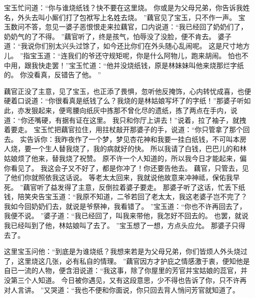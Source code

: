 宝玉忙问道：“你与谁烧纸钱？快不要在这里烧。
你或是为父母兄弟，你告诉我姓名，外头去叫小厮们打了包袱写上名姓去烧。
”藕官见了宝玉，只不作一声。
宝玉数问不答，忽见一婆子恶恨恨走来拉藕官，口内说道：“我已经回了奶奶们了，奶奶气的了不得。
”藕官听了，终是孩气，怕辱没了没脸，便不肯去。
婆子道：“我说你们别太兴头过馀了，如今还比你们在外头随心乱闹呢。
这是尺寸地方儿。
”指宝玉道：“连我们的爷还守规矩呢，你是什么阿物儿，跑来胡闹。
怕也不中用，跟我快走罢！”宝玉忙道：“他并没烧纸钱，原是林妹妹叫他来烧那烂字纸的。
你没看真，反错告了他。
”\par
藕官正没了主意，见了宝玉，也正添了畏惧，忽听他反掩饰，心内转忧成喜，也便硬着口说道：“你很看真是纸钱了么？我烧的是林姑娘写坏了的字纸！”那婆子听如此，亦发狠起来，便弯腰向纸灰中拣那不曾化尽的遗纸，拣了两点在手内，说道：“你还嘴硬，有据有证在这里。
我只和你厅上讲去！”说着，拉了袖子，就拽着要走。
宝玉忙把藕官拉住，用拄杖敲开那婆子的手，说道：“你只管拿了那个回去。
实告诉你：我昨夜作了一个梦，梦见杏花神和我要一挂白纸钱，不可叫本房人烧，要一个生人替我烧了，我的病就好的快。
所以我请了白钱，巴巴儿的和林姑娘烦了他来，替我烧了祝赞。
原不许一个人知道的，所以我今日才能起来，偏你看见了。
我这会子又不好了，都是你冲了！你还要告他去。
藕官，只管去，见了他们你就照依我这话说。
等老太太回来，我就说他故意来冲神祗，保佑我早死。
”藕官听了益发得了主意，反倒拉着婆子要走。
那婆子听了这话，忙丢下纸钱，陪笑央告宝玉道：“我原不知道，二爷若回了老太太，我这老婆子岂不完了？我如今回奶奶们去，就说是爷祭神，我看错了。
”宝玉道：“你也不许再回去了，我便不说。
”婆子道：“我已经回了，叫我来带他，我怎好不回去的。
也罢，就说我已经叫到了他，林姑娘叫了去了。
”宝玉想了一想，方点头应允。
那婆子只得去了。
\par
这里宝玉问他：“到底是为谁烧纸？我想来若是为父母兄弟，你们皆烦人外头烧过了，这里烧这几张，必有私自的情理。
”藕官因方才护庇之情感激于衷，便知他是自已一流的人物，便含泪说道：“我这事，除了你屋里的芳官并宝姑娘的蕊官，并没第三个人知道。
今日被你遇见，又有这段意思，少不得也告诉了你，只不许再对人言讲。
”又哭道：“我也不便和你面说，你只回去背人悄问芳官就知道了。
